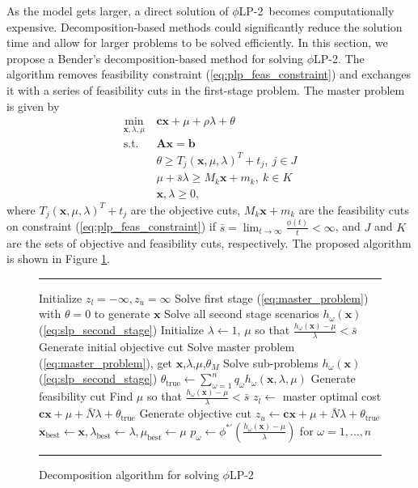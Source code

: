 \documentclass[ijoc,letterpaper]{informs3} %
\newcommand{\x}{\mathbf{x}}
\renewcommand{\c}{\mathbf{c}}
\newcommand{\A}{\mathbf{A}}
\renewcommand{\b}{\mathbf{b}}
\newcommand{\st}{\mbox{s.t.}}
\newcommand{\plp}{$\phi$LP-2}
\begin{document}
As the model gets larger, a direct solution of \plp\ becomes computationally expensive. 
Decomposition-based methods could significantly reduce the solution time and allow for larger problems to be solved efficiently. In this section, we propose a Bender's decomposition-based method for solving \plp.
The algorithm removes feasibility constraint (\ref{eq:plp_feas_constraint})  and exchanges it with a series of feasibility cuts in the first-stage problem.
The master problem is given by
\begin{align}
	\min_{\x,\lambda,\mu} \ & \c\x + \mu + \rho \lambda + \theta \label{eq:master_problem}\\
	\st \ & \A\x = \b \nonumber \\
	& \theta \geq T_j (\x,\mu,\lambda)^T + t_j, \ j \in J \nonumber \\
	& \mu + \bar{s}\lambda \geq M_k \x + m_k, \ k \in K \nonumber \\
	& \x,\lambda \geq 0, \nonumber
\end{align}
where $T_j (\x,\mu,\lambda)^T + t_j$ are the objective cuts, $M_k \x + m_k$ are the feasibility cuts on constraint (\ref{eq:plp_feas_constraint}) if $\bar{s} = \lim_{t \rightarrow \infty} \frac{\phi(t)}{t} < \infty$, and $J$ and $K$ are the sets of objective and feasibility cuts, respectively.
The proposed algorithm is shown in Figure \ref{fig:algorithm}.

\begin{figure}
\FIGURE
{\begin{minipage}{.5\textwidth}
	\TableSpaced
	\hrule
	\vspace{1pt}
	\begin{algorithmic}
		\State Initialize $z_l = -\infty, z_u = \infty$
		\State Solve first stage (\ref{eq:master_problem}) with $\theta = 0$  to generate $\x$
		\State Solve all second stage scenarios $h_\omega(\x)$ (\ref{eq:slp_second_stage})
		\State Initialize $\lambda \gets 1$, $\mu$ so that $\frac{h_\omega(\x) - \mu}{\lambda} < \bar{s}$
		\State Generate initial objective cut
			\State Solve master problem (\ref{eq:master_problem}), get $\x$,$\lambda$,$\mu$,$\theta_M$
			\State Solve sub-problems $h_\omega(\x)$ (\ref{eq:slp_second_stage})
			\State $\theta_{\text{true}} \gets \sum_{\omega=1}^n q_\omega h_\omega(\x,\lambda,\mu)$
			\If{$\frac{h_\omega(\x) - \mu}{\lambda} > \bar{s}$}
				\State Generate feasibility cut
				\State Find $\mu$ so that $\frac{h_\omega(\x) - \mu}{\lambda} < \bar{s}$
			\Else
				\State $z_l \gets$ master optimal cost $\c\x + \mu + \bar{N}\lambda + \theta_{\text{true}}$
			\EndIf
			\State Generate objective cut
			\If{$\c\x + \mu + \bar{N}\lambda + \theta_{\text{true}} < z_u$}
				\State $z_u \gets \c\x + \mu + \bar{N}\lambda + \theta_{\text{true}}$
				\State $\x_\text{best} \gets \x, \lambda_\text{best} \gets \lambda, \mu_\text{best} \gets \mu$
				\State $p_\omega \gets \phi^{*\prime}(\tfrac{h_\omega(\x) - \mu}{\lambda})$ for $\omega = 1, \dots, n$
			\EndIf
		\EndWhile
	\end{algorithmic}
	\hrule
\end{minipage}}
	{
		Decomposition algorithm for solving \plp
		\label{fig:algorithm}
	}
{}
\end{figure}
\end{document}
